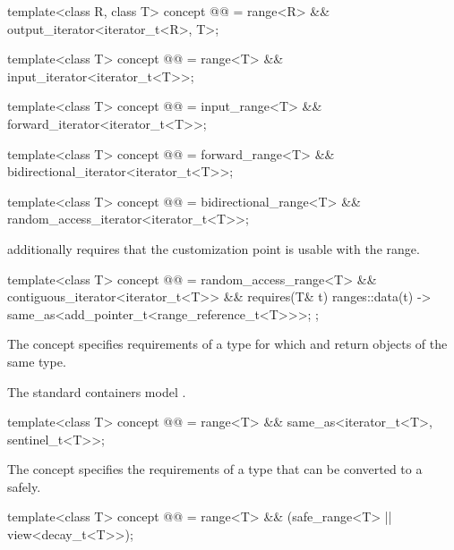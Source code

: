 \begin{itemdecl}
template<class R, class T>
  concept @@ =
    range<R> && output_iterator<iterator_t<R>, T>;

template<class T>
  concept @@ =
    range<T> && input_iterator<iterator_t<T>>;

template<class T>
  concept @@ =
    input_range<T> && forward_iterator<iterator_t<T>>;

template<class T>
  concept @@ =
    forward_range<T> && bidirectional_iterator<iterator_t<T>>;

template<class T>
  concept @@ =
    bidirectional_range<T> && random_access_iterator<iterator_t<T>>;
\end{itemdecl}

\pnum
{} additionally requires that
the  customization point
is usable with the range.

\begin{itemdecl}
template<class T>
  concept @@ =
    random_access_range<T> && contiguous_iterator<iterator_t<T>> &&
    requires(T& t) {
      { ranges::data(t) } -> same_as<add_pointer_t<range_reference_t<T>>>;
    };
\end{itemdecl}

\pnum
The  concept specifies requirements of
a  type for which  and
 return objects of the same type.
\begin{example}
The standard containers model .
\end{example}

\begin{itemdecl}
template<class T>
  concept @@ =
    range<T> && same_as<iterator_t<T>, sentinel_t<T>>;
\end{itemdecl}

\pnum
The  concept specifies the requirements of a
 type that can be converted to a  safely.

\begin{itemdecl}
template<class T>
  concept @@ =
    range<T> && (safe_range<T> || view<decay_t<T>>);
\end{itemdecl}

